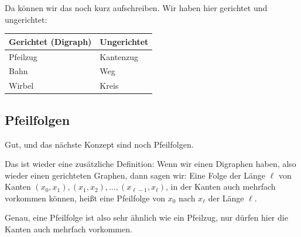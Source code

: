 \begin{spoken-clean}[01:06:39 - 01:07:32]
Da können wir das noch kurz aufschreiben. Wir haben hier gerichtet und ungerichtet:
\end{spoken-clean}

\begin{math-stroke}
\begin{center}
\begin{tabular}{l | l}
    \toprule
    \textbf{Gerichtet (Digraph)} & \textbf{Ungerichtet} \\
    \midrule
    Pfeilzug & Kantenzug \\
    Bahn     & Weg \\
    Wirbel   & Kreis \\
    \bottomrule
\end{tabular}
\end{center}
\end{math-stroke}

\subsection{Pfeilfolgen}

\begin{spoken-clean}[01:07:32 - 01:08:48]
Gut, und das nächste Konzept sind noch Pfeilfolgen.

Das ist wieder eine zusätzliche Definition: Wenn wir einen Digraphen haben, also wieder einen gerichteten Graphen, dann sagen wir: Eine Folge der Länge $\ell$ von Kanten $(x_0, x_1), (x_1, x_2), \dots, (x_{\ell-1}, x_\ell)$, in der Kanten auch mehrfach vorkommen können, heißt eine Pfeilfolge von $x_0$ nach $x_\ell$ der Länge $\ell$.

Genau, eine Pfeilfolge ist also sehr ähnlich wie ein Pfeilzug, nur dürfen hier die Kanten auch mehrfach vorkommen.
\end{spoken-clean}

\begin{math-stroke}
\end{math-stroke}

